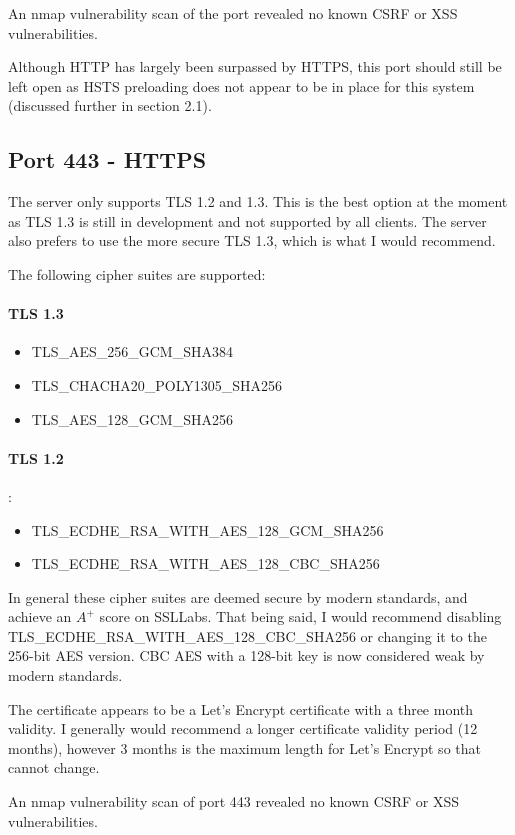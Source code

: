 \documentclass[12pt]{article}
\begin{document}
  An nmap vulnerability scan of the port revealed no known CSRF or XSS vulnerabilities.

  Although HTTP has largely been surpassed by HTTPS, this port should still be left open as HSTS preloading does not appear to be in place for this system (discussed further in section 2.1).

  \subsection{Port 443 - HTTPS}
  The server only supports TLS 1.2 and 1.3.
  This is the best option at the moment as TLS 1.3 is still in development and not supported by all clients.
  The server also prefers to use the more secure TLS 1.3, which is what I would recommend.
  
  The following cipher suites are supported:
  \paragraph{TLS 1.3}
  \begin{itemize}
    \item TLS\_AES\_256\_GCM\_SHA384
    \item TLS\_CHACHA20\_POLY1305\_SHA256
    \item TLS\_AES\_128\_GCM\_SHA256
  \end{itemize}
  \paragraph{TLS 1.2}:
  \begin{itemize}
    \item TLS\_ECDHE\_RSA\_WITH\_AES\_128\_GCM\_SHA256
    \item TLS\_ECDHE\_RSA\_WITH\_AES\_128\_CBC\_SHA256
  \end{itemize}

  In general these cipher suites are deemed secure by modern standards, and achieve an $A^+$ score on SSLLabs.
  That being said, I would recommend disabling TLS\_ECDHE\_RSA\_WITH\_AES\_128\_CBC\_SHA256 or changing it to the 256-bit AES version.
  CBC AES with a 128-bit key is now considered weak by modern standards.

  The certificate appears to be a Let's Encrypt certificate with a three month validity.
  I generally would recommend a longer certificate validity period (12 months), however 3 months is the maximum length for Let's Encrypt so that cannot change.

  An nmap vulnerability scan of port 443 revealed no known CSRF or XSS vulnerabilities.
\end{document}

